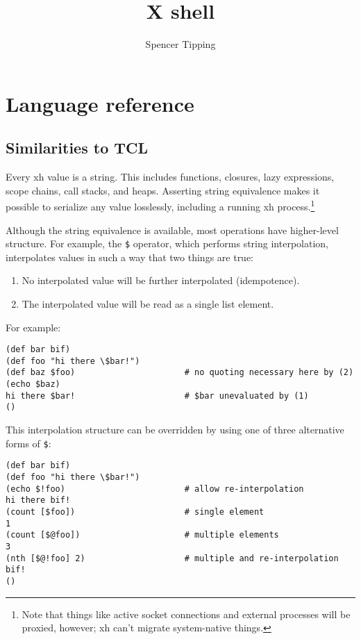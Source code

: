 \documentclass{report}
\title{X shell}
\author{Spencer Tipping}
\begin{document}
\maketitle{}
\tableofcontents{}


\part{Language reference}\label{part:language-reference}
\chapter{Similarities to TCL}\label{chp:similarities-to-tcl}
  Every xh value is a string. This includes functions, closures, lazy
  expressions, scope chains, call stacks, and heaps. Asserting string
  equivalence makes it possible to serialize any value losslessly, including a
  running xh process.\footnote{Note that things like active socket connections
  and external processes will be proxied, however; xh can't migrate
  system-native things.}

  Although the string equivalence is available, most operations have
  higher-level structure. For example, the \verb|$| operator, which performs
  string interpolation, interpolates values in such a way that two things are
  true:

\begin{enumerate}
\item{No interpolated value will be further interpolated (idempotence).}
\item{The interpolated value will be read as a single list element.}
\end{enumerate}

  For example:

\begin{verbatim}
(def bar bif)
(def foo "hi there \$bar!")
(def baz $foo)                      # no quoting necessary here by (2)
(echo $baz)
hi there $bar!                      # $bar unevaluated by (1)
()
\end{verbatim}

  This interpolation structure can be overridden by using one of three
  alternative forms of \verb|$|:

\begin{verbatim}
(def bar bif)
(def foo "hi there \$bar!")
(echo $!foo)                        # allow re-interpolation
hi there bif!
(count [$foo])                      # single element
1
(count [$@foo])                     # multiple elements
3
(nth [$@!foo] 2)                    # multiple and re-interpolation
bif!
()
\end{verbatim}
\end{document}
